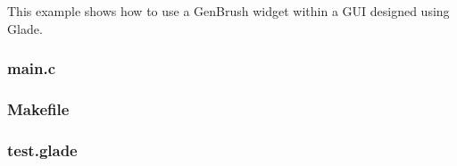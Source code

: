 This example shows how to use a GenBrush widget within a GUI designed using Glade.

\subsubsection{main.c}

\begin{scriptsize}
\begin{ttfamily}

\end{ttfamily}
\end{scriptsize}

\subsubsection{Makefile}

\begin{scriptsize}
\begin{ttfamily}

\end{ttfamily}
\end{scriptsize}

\subsubsection{test.glade}

\begin{scriptsize}
\begin{ttfamily}

\end{ttfamily}
\end{scriptsize}
